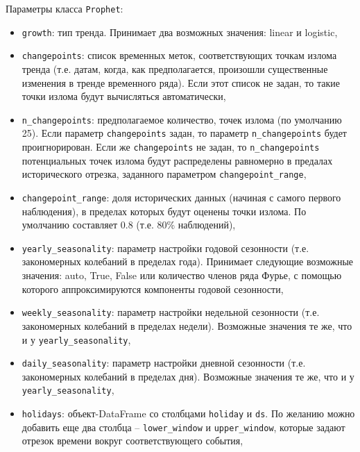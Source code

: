 \documentclass[%
	11pt,
	a4paper,
	utf8,
		]{article}
\begin{document}
Параметры класса \texttt{Prophet}:
\begin{itemize}
	\item \texttt{growth}: тип тренда. Принимает два возможных значения: linear и logistic,
	
	\item \texttt{changepoints}: список временных меток, соответствующих точкам излома тренда (т.е. датам, когда, как предполагается, произошли существенные изменения в тренде временного ряда). Если этот список не задан, то такие точки излома будут вычисляться автоматически,
	
	\item \texttt{n\_changepoints}: предполагаемое количество, точек излома (по умолчанию 25). Если параметр \texttt{changepoints} задан, то параметр \texttt{n\_changepoints} будет проигнорирован. Если же \texttt{changepoints} не задан, то \texttt{n\_changepoints} потенциальных точек излома будут распределены равномерно в предалах исторического отрезка, заданного параметром \texttt{changepoint\_range},
	
	\item \texttt{changepoint\_range}: доля исторических данных (начиная с самого первого наблюдения), в пределах которых будут оценены точки излома. По умолчанию составляет 0.8 (т.е. 80\% наблюдений),
	
	\item \texttt{yearly\_seasonality}: параметр настройки годовой сезонности (т.е. закономерных колебаний в пределах года). Принимает следующие возможные значения: auto, True, False или количество членов ряда Фурье, с помощью которого аппроксимируются компоненты годовой сезонности,
	
	\item \texttt{weekly\_seasonality}: параметр настройки недельной сезонности (т.е. закономерных колебаний в пределах недели). Возможные значения те же, что и у \texttt{yearly\_seasonality},
	
	\item \texttt{daily\_seasonality}: параметр настройки дневной сезонности (т.е. закономерных колебаний в пределах дня). Возможные значения те же, что и у \texttt{yearly\_seasonality},
	
	\item \texttt{holidays}: объект-DataFrame со столбцами \texttt{holiday} и \texttt{ds}. По желанию можно добавить еще два столбца -- \texttt{lower\_window} и \texttt{upper\_window}, которые задают отрезок времени вокруг соответствующего события,
	

\end{itemize}
\end{document}
